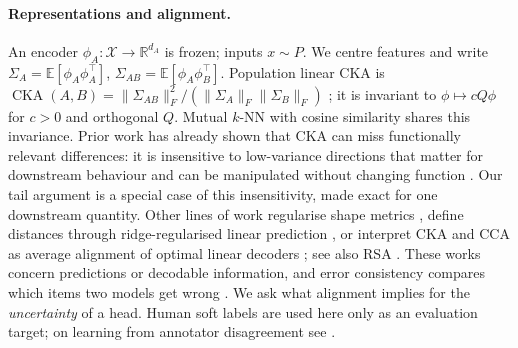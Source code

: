 \documentclass[twoside]{article}
\theoremstyle{definition}
\theoremstyle{remark}
\newcommand{\E}{\mathbb{E}}
\newcommand{\R}{\mathbb{R}}
\newcommand{\cka}{\operatorname{CKA}}
\begin{document}
\paragraph{Representations and alignment.}
An encoder $\phi_A:\mathcal X\to\R^{d_A}$ is frozen; inputs $x\sim P$.
We centre features and write $\Sigma_A=\E[\phi_A\phi_A^\top]$, $\Sigma_{AB}=\E[\phi_A\phi_B^\top]$.
Population linear CKA is $\cka(A,B)=\|\Sigma_{AB}\|_F^2/(\|\Sigma_A\|_F\|\Sigma_B\|_F)$ \citep{kornblith2019similarity}; it is invariant to $\phi\mapsto cQ\phi$ for $c>0$ and orthogonal $Q$.
Mutual $k$-NN with cosine similarity \citep{huh2024platonic} shares this invariance.
Prior work has already shown that CKA can miss functionally relevant differences: it is insensitive to low-variance directions that matter for downstream behaviour \citep{ding2021grounding} and can be manipulated without changing function \citep{davari2023reliability}. Our tail argument is a special case of this insensitivity, made exact for one downstream quantity. Other lines of work regularise shape metrics \citep{williams2021generalized}, define distances through ridge-regularised linear prediction \citep[GULP;][]{boixadsera2022gulp}, or interpret CKA and CCA as average alignment of optimal linear decoders \citep{harvey2024decodable}; see also RSA \citep{kriegeskorte2008rsa}. These works concern predictions or decodable information, and error consistency compares which items two models get wrong \citep{geirhos2020error}. We ask what alignment implies for the \emph{uncertainty} of a head. Human soft labels are used here only as an evaluation target; on learning from annotator disagreement see \citet{uma2021disagreement}.
\end{document}
